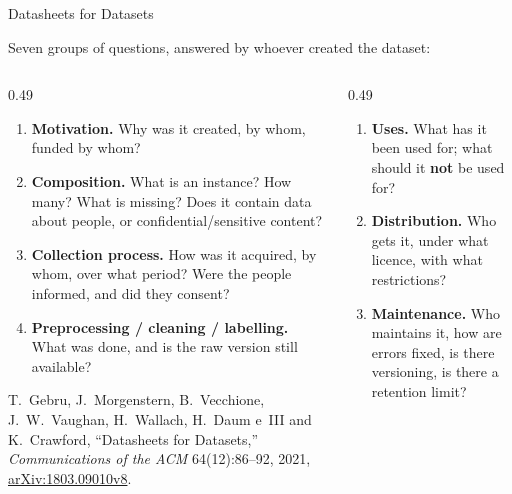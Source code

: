 \begin{frame}[allowframebreaks]{Datasheets for Datasets}

    Seven groups of questions, answered by whoever created the dataset:

    \vspace{0.18em}

    \begin{columns}[T]
        \begin{column}{0.49\textwidth}
            \begin{enumerate}\scriptsize
                \setlength\itemsep{0.1em}
                \item \textbf{Motivation.} Why was it created, by whom, funded by whom?
                \item \textbf{Composition.} What is an instance? How many? What is missing? Does it
                      contain data about people, or confidential/sensitive content?
                \item \textbf{Collection process.} How was it acquired, by whom, over what period?
                      Were the people informed, and did they consent?
                \item \textbf{Preprocessing / cleaning / labelling.} What was done, and is the raw
                      version still available?
            \end{enumerate}

            \vspace{0.6em}
            {\scriptsize T.~Gebru, J.~Morgenstern, B.~Vecchione, J.~W.~Vaughan, H.~Wallach, H.~Daum e~III
            and K.~Crawford, ``Datasheets for Datasets,'' \emph{Communications of the ACM} 64(12):86--92,
            2021, \href{https://arxiv.org/abs/1803.09010v8}{arXiv:1803.09010v8}.}
        \end{column}
        \begin{column}{0.49\textwidth}
            \begin{enumerate}\scriptsize
                \setlength\itemsep{0.1em}
                \setcounter{enumi}{4}
                \item \textbf{Uses.} What has it been used for; what should it \textbf{not} be used
                      for?
                \item \textbf{Distribution.} Who gets it, under what licence, with what
                      restrictions?
                \item \textbf{Maintenance.} Who maintains it, how are errors fixed, is there
                      versioning, is there a retention limit?
            \end{enumerate}


\end{column}
\end{columns}
\end{frame}
